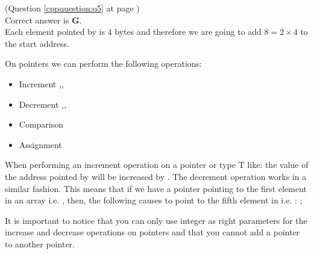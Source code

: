 \begin{cppanswer}
    \label{cppquestion:s5}
    (Question \ref{cppquestion:q5} at page \pageref{cppquestion:q5}) \hfill \\
    Correct answer is \textbf{G}. \\
    Each element pointed by  is $4$ bytes and therefore we are going to add $8=2\times 4$ to the start address.

    On pointers we can perform the following operations:
    \begin{itemize}
        \item Increment \inline{++},\inline{+},\inline{+=}
        \item Decrement \inline{--},\inline{-},\inline{-=}
        \item Comparison \inline{==}
        \item Assignment \inline{=}
    \end{itemize}

    When performing an increment operation on a pointer  or type T like:  the value of the address pointed by  will be increased by . The decrement operation works in a similar fashion.
    This means that if we have a  pointer  pointing to the first element in an array  i.e. , then, the following causes  to point to the fifth element in  i.e. :   ;

    It is important to notice that you can only use integer as right parameters for the increase and decrease operations on pointers and that you cannot add a pointer to another pointer.
\end{cppanswer}